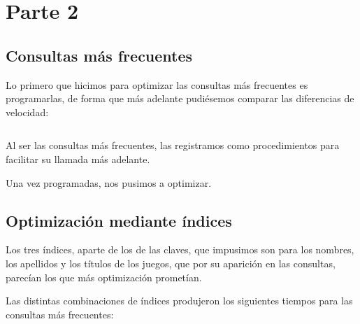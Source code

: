\documentclass[a4paper, 11pt, oneside]{article} %
\newcommand{\scriptdir}{../scripts/} %
\begin{document}
\newpage


\section{Parte 2}

\subsection{Consultas más frecuentes}

Lo primero que hicimos para optimizar las consultas más frecuentes es programarlas, de forma que más adelante pudiésemos comparar las diferencias de velocidad:

\inputminted{mysql}{\scriptdir consultas/procedures.sql}

Al ser las consultas más frecuentes, las registramos como procedimientos para facilitar su llamada más adelante.

Una vez programadas, nos pusimos a optimizar.

\subsection{Optimización mediante índices}

Los tres índices, aparte de los de las claves, que impusimos son para los nombres, los apellidos y los títulos de los juegos, que por su aparición en las consultas, parecían los que más optimización prometían.

Las distintas combinaciones de índices produjeron los siguientes tiempos para las consultas más frecuentes:
\end{document}
